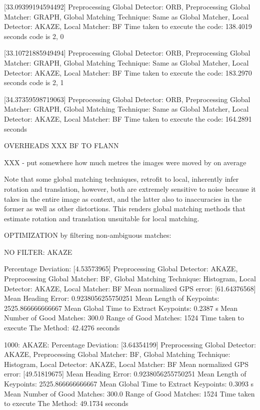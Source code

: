 [33.09399194594492]
Preprocessing Global Detector: ORB, Preprocessing Global Matcher: GRAPH, Global Matching Technique: Same as Global Matcher, Local Detector: AKAZE, Local Matcher: BF
Time taken to execute the code: 138.4019 seconds
code is 2, 0


[33.10721885949494]
Preprocessing Global Detector: ORB, Preprocessing Global Matcher: GRAPH, Global Matching Technique: Same as Global Matcher, Local Detector: AKAZE, Local Matcher: BF
Time taken to execute the code: 183.2970 seconds
code is 2, 1


[34.37359598719063]
Preprocessing Global Detector: ORB, Preprocessing Global Matcher: GRAPH, Global Matching Technique: Same as Global Matcher, Local Detector: AKAZE, Local Matcher: BF
Time taken to execute the code: 164.2891 seconds

OVERHEADS XXX BF TO FLANN

XXX - put somewhere how much metres the images were moved by on average


Note that some global matching techniques, retrofit to local, inherently infer rotation and translation, however, both are extremely sensitive to noise because it takes in the entire image as context, and the latter also to inaccuracies in the former as well as other distortions. This renders global matching methods that estimate rotation and translation unsuitable for local matching.  





OPTIMIZATION by filtering non-ambiguous matches:

NO FILTER: AKAZE


Percentage Deviation: [4.53573965] %
Preprocessing Global Detector: AKAZE, Preprocessing Global Matcher: BF, Global Matching Technique: Histogram, Local Detector: AKAZE, Local Matcher: BF
Mean normalized GPS error: [61.64376568]
 Mean Heading Error: 0.9238056255750251
Mean Length of Keypoints: 2525.866666666667
Mean Global Time to Extract Keypoints: 0.2387 s
Mean Number of Good Matches: 300.0
Range of Good Matches: 1524
Time taken to execute The Method: 42.4276 seconds


1000: AKAZE:
Percentage Deviation: [3.64354199] %
Preprocessing Global Detector: AKAZE, Preprocessing Global Matcher: BF, Global Matching Technique: Histogram, Local Detector: AKAZE, Local Matcher: BF
Mean normalized GPS error: [49.51819675]
 Mean Heading Error: 0.9238056255750251
Mean Length of Keypoints: 2525.866666666667
Mean Global Time to Extract Keypoints: 0.3093 s
Mean Number of Good Matches: 300.0
Range of Good Matches: 1524
Time taken to execute The Method: 49.1734 seconds

